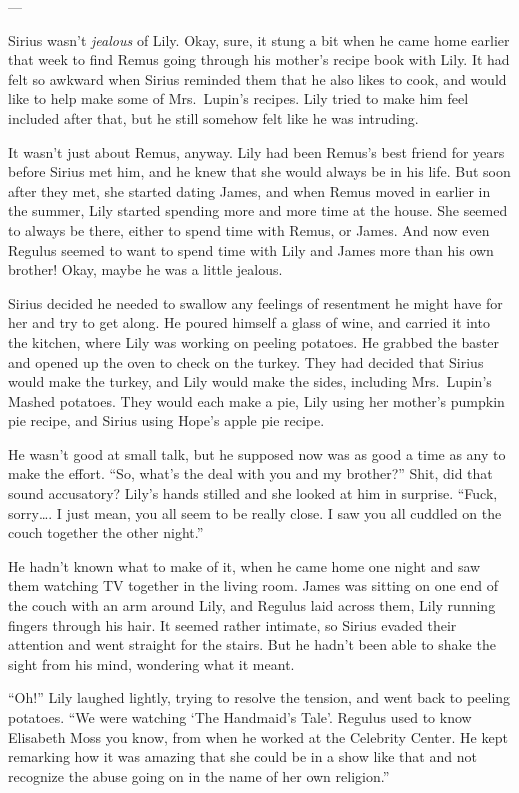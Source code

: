 \documentclass[12pt,twoside,openright]{memoir}
\begin{document}
---

Sirius wasn't \textit{jealous} of Lily. Okay, sure, it stung a bit when he came home earlier that week to find Remus going through his mother's recipe book with Lily. It had felt so awkward when Sirius reminded them that he also likes to cook, and would like to help make some of Mrs.\ Lupin's recipes. Lily tried to make him feel included after that, but he still somehow felt like he was intruding. 

It wasn't just about Remus, anyway. Lily had been Remus's best friend for years before Sirius met him, and he knew that she would always be in his life. But soon after they met, she started dating James, and when Remus moved in earlier in the summer, Lily started spending more and more time at the house. She seemed to always be there, either to spend time with Remus, or James. And now even Regulus seemed to want to spend time with Lily and James more than his own brother! Okay, maybe he was a little jealous.

Sirius decided he needed to swallow any feelings of resentment he might have for her and try to get along. He poured himself a glass of wine, and carried it into the kitchen, where Lily was working on peeling potatoes. He grabbed the baster and opened up the oven to check on the turkey. They had decided that Sirius would make the turkey, and Lily would make the sides, including Mrs.\ Lupin's Mashed potatoes. They would each make a pie, Lily using her mother's pumpkin pie recipe, and Sirius using Hope's apple pie recipe. 

He wasn't good at small talk, but he supposed now was as good a time as any to make the effort. ``So, what's the deal with you and my brother?'' Shit, did that sound accusatory? Lily's hands stilled and she looked at him in surprise.
``Fuck, sorry…. I just mean, you all seem to be really close. I saw you all cuddled on the couch together the other night.''

He hadn't known what to make of it, when he came home one night and saw them watching TV together in the living room. James was sitting on one end of the couch with an arm around Lily, and Regulus laid across them, Lily running fingers through his hair. It seemed rather intimate, so Sirius evaded their attention and went straight for the stairs. But he hadn't been able to shake the sight from his mind, wondering what it meant.

``Oh!'' Lily laughed lightly, trying to resolve the tension, and went back to peeling potatoes. ``We were watching ‘The Handmaid's Tale'. Regulus used to know Elisabeth Moss you know, from when he worked at the Celebrity Center. He kept remarking how it was amazing that she could be in a show like that and not recognize the abuse going on in the name of her own religion.'' 
\end{document}
